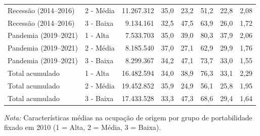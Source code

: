 {\begin{tabular}{llrrrrrr}
Recessão (2014–2016) & 2 - Média & 11.267.312 & 35,0 & 23,2 & 51,2 & 22,8 & 2,08 \\
Recessão (2014–2016) & 3 - Baixa & 9.134.161 & 32,5 & 47,5 & 63,9 & 26,0 & 1,72 \\
\addlinespace[3pt]
Pandemia (2019–2021) & 1 - Alta & 7.533.703 & 35,0 & 39,0 & 80,3 & 37,9 & 2,06 \\
Pandemia (2019–2021) & 2 - Média & 8.185.540 & 37,0 & 27,1 & 62,9 & 29,9 & 1,76 \\
Pandemia (2019–2021) & 3 - Baixa & 8.299.367 & 34,2 & 47,1 & 73,7 & 33,0 & 1,55 \\
\addlinespace[3pt]
Total acumulado & 1 - Alta & 16.482.594 & 34,0 & 38,9 & 76,3 & 33,1 & 2,29 \\
Total acumulado & 2 - Média & 19.452.852 & 35,9 & 24,9 & 56,1 & 25,8 & 1,95 \\
Total acumulado & 3 - Baixa & 17.433.528 & 33,3 & 47,3 & 68,6 & 29,4 & 1,64 \\
\bottomrule
\end{tabular}
\vspace{2pt}
\par{\footnotesize \textit{Nota:} Características médias na ocupação de origem por grupo de portabilidade fixado em 2010 (1 = Alta, 2 = Média, 3 = Baixa).}
}
